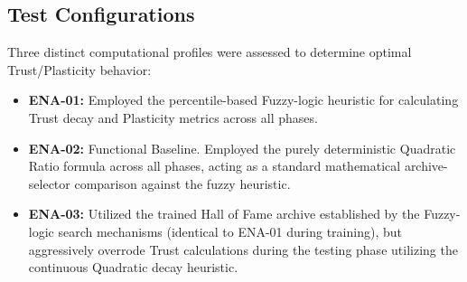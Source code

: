 \subsection{Test Configurations}
Three distinct computational profiles were assessed to determine optimal Trust/Plasticity behavior:
\begin{itemize}
    \item \textbf{ENA-01:} Employed the percentile-based Fuzzy-logic heuristic for calculating Trust decay and Plasticity metrics across all phases.
    \item \textbf{ENA-02:} Functional Baseline. Employed the purely deterministic Quadratic Ratio formula across all phases, acting as a standard mathematical archive-selector comparison against the fuzzy heuristic.
    \item \textbf{ENA-03:} Utilized the trained Hall of Fame archive established by the Fuzzy-logic search mechanisms (identical to ENA-01 during training), but aggressively overrode Trust calculations during the testing phase utilizing the continuous Quadratic decay heuristic.
\end{itemize}
